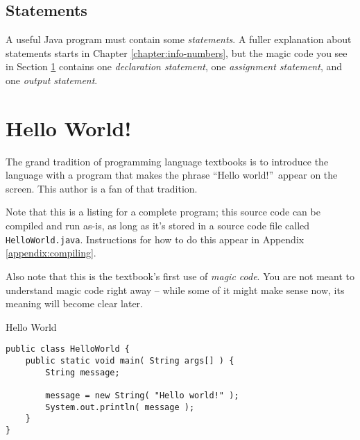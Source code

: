 \subsection{Statements}
A useful Java program must contain some \textit{statements}.  A fuller explanation about statements starts in Chapter \ref{chapter:info-numbers}, but the magic code you see in Section \ref{sec:helloworld} contains one \textit{declaration statement}, one \textit{assignment statement}, and one \textit{output statement}.

\section{Hello World!}
\label{sec:helloworld}

The grand tradition of programming language textbooks is to introduce the language with a program that makes the phrase ``Hello world!''\ appear on the screen.  This author is a fan of that tradition.

Note that this is a listing for a complete program; this source code can be compiled and run as-is, as long as it's stored in a source code file called \texttt{HelloWorld.java}.  Instructions for how to do this appear in Appendix \ref{appendix:compiling}.

Also note that this is the textbook's first use of \textit{magic code}.  You are not meant to understand magic code right away -- while some of it might make sense now, its meaning will become clear later.

\begin{magic}{Hello World}
\begin{verbatim}
public class HelloWorld {
    public static void main( String args[] ) {
        String message;

        message = new String( "Hello world!" );
        System.out.println( message );
    }
}
\end{verbatim}
\end{magic}
